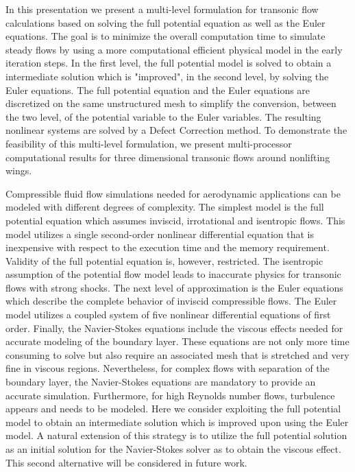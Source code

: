 \documentclass[11pt]{article}
\begin{document}
In this presentation we present a multi-level formulation for
transonic flow calculations based on solving the full potential
equation as well as the Euler equations. The goal is to minimize the
overall computation time to simulate steady flows by using a more
computational efficient physical model in the early iteration
steps. In the first level, the full potential model is solved to
obtain a intermediate solution which is "improved", in the second
level, by solving the Euler equations.  The full potential equation
and the Euler equations are discretized on the same unstructured mesh
to simplify the conversion, between the two level, of the potential
variable to the Euler variables. The resulting nonlinear systems are
solved by a Defect Correction method. To demonstrate the feasibility
of this multi-level formulation, we present multi-processor
computational results for three dimensional transonic flows around
nonlifting wings.

Compressible fluid flow simulations needed for aerodynamic
applications can be modeled with different degrees of complexity. The
simplest model is the full potential equation which assumes inviscid,
irrotational and isentropic flows. This model utilizes a single
second-order nonlinear differential equation that is inexpensive with
respect to the execution time and the memory requirement. Validity of
the full potential equation is, however, restricted. The isentropic
assumption of the potential flow model leads to inaccurate physics for
transonic flows with strong shocks. The next level of approximation is
the Euler equations which describe the complete behavior of inviscid
compressible flows. The Euler model utilizes a coupled system of five
nonlinear differential equations of first order. Finally, the
Navier-Stokes equations include the viscous effects needed for
accurate modeling of the boundary layer. These equations are not only
more time consuming to solve but also require an associated mesh that
is stretched and very fine in viscous regions.  Nevertheless, for
complex flows with separation of the boundary layer, the Navier-Stokes
equations are mandatory to provide an accurate
simulation. Furthermore, for high Reynolds number flows, turbulence
appears and needs to be modeled.  Here we consider exploiting the full
potential model to obtain an intermediate solution which is improved
upon using the Euler model. A natural extension of this strategy is to
utilize the full potential solution as an initial solution for the
Navier-Stokes solver as to obtain the viscous effect. This second
alternative will be considered in future work.
\end{document}
